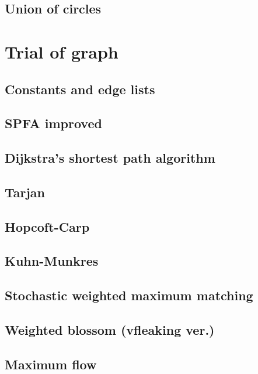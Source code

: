 \documentclass[a4paper]{report}
\begin{document}
		\section{Union of circles}	
			
	\chapter{Trial of graph}
		\section{Constants and edge lists}
			
		\section{SPFA improved}
			
		\section{Dijkstra's shortest path algorithm}
			
		\section{Tarjan}
			
		\section{Hopcoft-Carp}
			
		\section{Kuhn-Munkres}
			
		\section{Stochastic weighted maximum matching}
			
		\section{Weighted blossom (vfleaking ver.)}	
			
		\section{Maximum flow}
			
\end{document}

